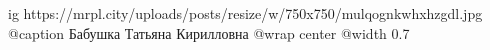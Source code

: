  
 
 
 
 

\ifcmt
  ig https://mrpl.city/uploads/posts/resize/w/750x750/mulqognkwhxhzgdl.jpg
	@caption Бабушка Татьяна Кирилловна
  @wrap center
  @width 0.7
\fi
